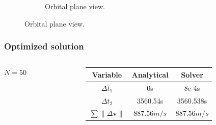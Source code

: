 \documentclass{beamer}
\begin{document}
\begin{frame}
\begin{figure}[htbp]
\begin{subfigure}{0.49\textwidth}
            \caption{Orbital plane view.}
        \end{subfigure}
        \label{fig:hohmann_lambert}
    \end{figure}

\end{frame}

\begin{frame}
    \frametitle{Optimized solution}
    \begin{columns}
        \begin{column}{0.3\textwidth}\centering
            \(N = 50\)
        \end{column}
        \begin{column}{0.7\textwidth}
            \begin{table}[htbp]
                \centering
                \begin{tabular}{ccc} \toprule
                    Variable & Analytical & Solver \\ \midrule
                    \(\Delta t_1\) & 0s & 8e-4s \\
                    \(\Delta t_2\) & 3560.54s & 3560.538s \\
                    \(\sum \lVert \Delta \mathbf{v} \rVert\) & \(887.56m/s\) & \(887.56m/s\) \\ \bottomrule
                \end{tabular}
                \label{tab:hohmann_results}
            \end{table}
        \end{column}
    \end{columns}
    

\end{frame}
\end{document}
